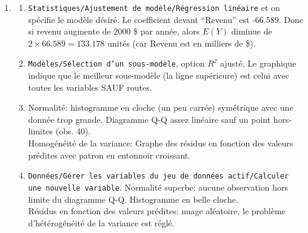 \documentclass[12pt]{article}
\begin{document}
{\begin{enumerate}
\item 
    \begin{enumerate}
    \item[(a)] {\tt Statistiques/Ajustement de modèle/Régression linéaire}  et    on spécifie le modèle désiré. Le coefficient devant ``Revenu'' est -66.589. Donc si revenu augmente de 2000 \$ par année,    alors $E(Y)$ diminue de $2\times 66.589=133.178$ unités (car Revenu est en milliers de \$).
    \item[(b)] {\tt Modèles/Sélection d'un sous-modèle}, option $R^2$ ajusté. Le graphique   indique que le meilleur sous-modèle (la ligne supérieure) est celui avec toutes les variables SAUF routes.
    \item[(c)] Normalité: histogramme en cloche (un peu carrée) symétrique avec une donnée trop grande. Diagramme Q-Q assez linéaire sauf un point hors-limites (obs. 40).\\
        Homogénéité de la variance: Graphe des résidus en fonction des valeurs prédites avec patron en entonnoir croissant. 
    \item[(d)] {\tt Données/Gérer les variables du jeu de données actif/Calculer une nouvelle variable}. Normalité superbe: aucune observation hors limite du diagramme Q-Q. Histogramme en belle cloche.\\
        Résidus en fonction des valeurs prédites: nuage aléatoire, le problème d'hétérogénéité de la variance est réglé.
    \end{enumerate}
\end{enumerate}

}
\end{document}
